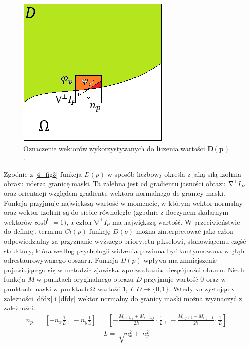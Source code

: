 \documentclass[12pt, twoside, openany]{report}
\theoremstyle{definition}
\begin{document}
\begin{figure}[!h]
	\centering
	\includegraphics[scale=1]{rysunki/4_fig3}
	\caption{Oznaczenie wektorów wykorzystywanych do liczenia wartości $\boldsymbol{D}\left(\boldsymbol{p}\right)$.}
	\label{4_fig3} 
\end{figure}
Zgodnie z \autoref{4_fig3} funkcja $D\left(p\right)$ w sposób liczbowy określa z jaką siłą izolinia obrazu uderza granicę maski. Ta zalebna jest od gradientu jasności obrazu ${\mathrm{\nabla }}^{\bot }I_P$ oraz orientacji względem gradientu wektora normalnego do granicy maski. Funkcja przyjmuje największą wartość w momencie, w którym wektor normalny oraz wektor izolinii są do siebie równoległe (zgodnie z iloczynem skalarnym wektorów ${\mathrm{cos} 0^0\ }=1)$, a człon ${\mathrm{\nabla }}^{\bot }I_P$ ma największą wartość. W przeciwieństwie do definicji terminu $Ct(p)$ funkcję $D(p)$ można zinterpretować jako człon odpowiedzialny za przyznanie wyższego priorytetu pikselowi, stanowiącemu część struktury, która według psychologii widzenia powinna być kontynuowana w głąb odrestaurowywanego obszaru. Funkcja $D(p)$ wpływa ma zmniejszenie pojawiającego się w metodzie zjawiska wprowadzania niespójności obrazu. Niech funkcja $M$ w punktach oryginalnego obrazu $D$ przyjmuje wartość 0 oraz w punktach maski w punktach $\mathrm{\Omega }$ wartość 1, $I:D\to \{0,1\}$.  Wtedy korzystając z zależności \eqref{dfdx} i \eqref{dfdy} wektor normalny do granicy maski można wyznaczyć z zależności:
\begin{align}
n_p=\ \ \left[-n_x\frac{1}{L}\ ,\ -n_y\frac{1}{L}\right]\ =\ \left[-\frac{M_{i+1,j}+M_{i-1,j}}{2h}\cdot \frac{1}{L}\ ,\ -\frac{M_{i,j+1}+M_{i,j-1}}{2h}\cdot \frac{1}{L}\right]
\label{KIERUNEK}
\end{align}
\begin{align}
L=\ \sqrt{n^2_x+\ n^2_y}
\label{POMKIERUNEK}
\end{align}
\end{document}
